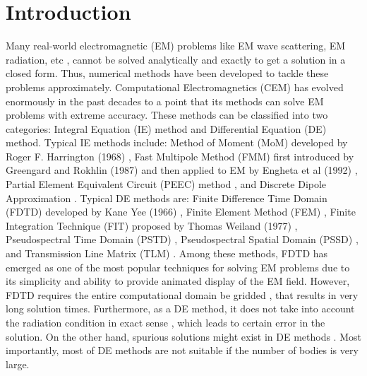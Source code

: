 \documentclass[12pt]{article}
\numberwithin{equation}{section}
\begin{document}
\section{Introduction} \label{sec0}
Many real-world electromagnetic (EM) problems like EM wave scattering, EM radiation, etc \cite{Tsang2004}, cannot be solved analytically and exactly to get a solution in a closed form. Thus, numerical methods have been developed to tackle these problems approximately. Computational Electromagnetics (CEM) has evolved enormously in the past decades to a point that its methods can solve EM problems with extreme accuracy. These methods can be classified into two categories: Integral Equation (IE) method and Differential Equation (DE) method. Typical IE methods include: Method of Moment (MoM) developed by Roger F. Harrington (1968) \cite{harrington1996field}, Fast Multipole Method (FMM) first introduced by Greengard and Rokhlin (1987) \cite{GR1987} and then applied to EM by Engheta et al (1992) \cite{engheta1985fast}, Partial Element Equivalent Circuit (PEEC) method \cite{ruehli1974equivalent}, and Discrete Dipole Approximation \cite{devoe1964optical}. Typical DE methods are: Finite Difference Time Domain (FDTD) developed by Kane Yee (1966) \cite{yee1966numerical}, Finite Element Method (FEM) \cite{zienkiewicz1977finite}, Finite Integration Technique (FIT) proposed by Thomas Weiland (1977) \cite{weiland2001discrete}, Pseudospectral Time Domain (PSTD) \cite{liu1997pstd}, Pseudospectral Spatial Domain (PSSD) \cite{tyrrell2005pseudospectral}, and Transmission Line Matrix (TLM) \cite{hoefer1985transmission}. Among these methods, FDTD has emerged as one of the most popular techniques for solving EM problems due to its simplicity and ability to provide animated display of the EM field. However, FDTD requires the entire computational domain be gridded \cite{stavroulakis2013biological}, that results in very long solution times. Furthermore, as a DE method, it does not take into account the radiation condition in exact sense \cite{kunz1993finite, buchanan1993simulation}, which leads to certain error in the solution. On the other hand, spurious solutions might exist in DE methods \cite{mur2002causes, lu2004elimination, zhao2007spurious}. Most importantly, most of DE methods are not suitable if the number of bodies is very large.
\end{document}

